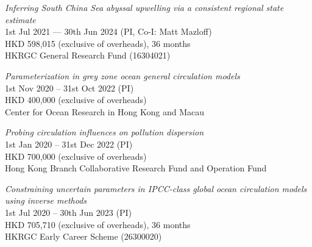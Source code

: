\documentclass[letterpaper]{article}
\renewenvironment{itemize}{
  \begin{list}{}{
    \setlength{\leftmargin}{1.5em}
  }
}{
  \end{list}
}
\begin{document}
\begin{itemize}
\item[--] \textit{Inferring South China Sea abyssal upwelling via a consistent regional state estimate}\\
1st Jul 2021 --- 30th Jun 2024 (PI, Co-I: Matt Mazloff)\\
HKD 598,015 (exclusive of overheads), 36 months\\
HKRGC General Research Fund (16304021)

\item[--] \textit{Parameterization in grey zone ocean general circulation models}\\
1st Nov 2020 -- 31st Oct 2022 (PI)\\
HKD 400,000 (exclusive of overheads)\\
Center for Ocean Research in Hong Kong and Macau

\item[--] \textit{Probing circulation influences on pollution dispersion}\\
1st Jan 2020 -- 31st Dec 2022 (PI)\\
HKD 700,000 (exclusive of overheads)\\ 
Hong Kong Branch Collaborative Research Fund and Operation Fund

\item[--] \textit{Constraining uncertain parameters in IPCC-class global ocean
circulation models using inverse methods}\\
1st Jul 2020 -- 30th Jun 2023 (PI)\\
HKD 705,710 (exclusive of overheads), 36 months \\
HKRGC Early Career Scheme (26300020)

\end{itemize}


\end{document}
